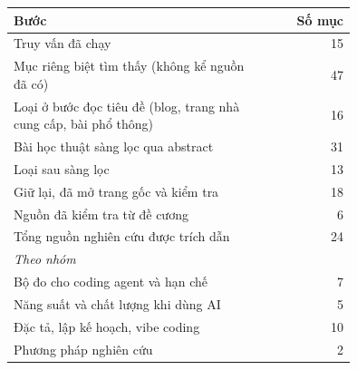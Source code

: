 \begin{tabular}{p{0.75\linewidth}r}
\toprule
Bước & Số mục \\
\midrule
Truy vấn đã chạy & 15 \\
Mục riêng biệt tìm thấy (không kể nguồn đã có) & 47 \\
Loại ở bước đọc tiêu đề (blog, trang nhà cung cấp, bài phổ thông) & 16 \\
Bài học thuật sàng lọc qua abstract & 31 \\
Loại sau sàng lọc & 13 \\
Giữ lại, đã mở trang gốc và kiểm tra & 18 \\
Nguồn đã kiểm tra từ đề cương & 6 \\
Tổng nguồn nghiên cứu được trích dẫn & 24 \\
\midrule\multicolumn{2}{l}{\textit{Theo nhóm}} \\
Bộ đo cho coding agent và hạn chế & 7 \\
Năng suất và chất lượng khi dùng AI & 5 \\
Đặc tả, lập kế hoạch, vibe coding & 10 \\
Phương pháp nghiên cứu & 2 \\
\bottomrule
\end{tabular}
